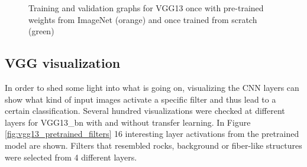 \begin{figure}[!h]
\centering
\caption{Training and validation graphs for VGG13 once with pre-trained weights from ImageNet (orange) and once trained from scratch (green)}
\label{fig:vgg13-graph}
\end{figure}

\quad

\subsection{VGG visualization}

In order to shed some light into what is going on, visualizing the CNN layers can show what kind of input images activate a specific filter and thus lead to a certain classification. Several hundred visualizations were checked at different layers for VGG13\_bn with and without transfer learning. In Figure \ref{fig:vgg13_pretrained_filters} 16 interesting layer activations from the pretrained model are shown. Filters that resembled rocks, background or fiber-like structures were selected from 4 different layers. \\


